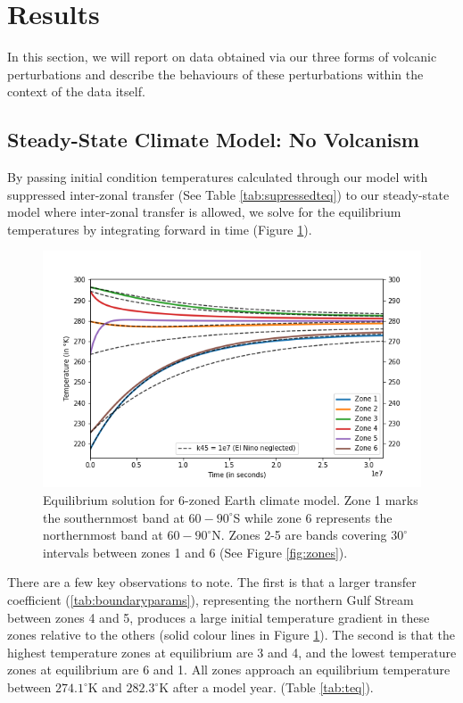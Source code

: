 \documentclass{article}
\begin{document}
\section{Results}
\label{section:results}
In this section, we will report on data obtained via our three forms of volcanic perturbations and describe the behaviours of these perturbations within the context of the data itself.

\subsection{Steady-State Climate Model: No Volcanism}
By passing initial condition temperatures calculated through our model with suppressed inter-zonal transfer (See Table \ref{tab:supressedteq}) to our steady-state model where inter-zonal transfer is allowed, we solve for the equilibrium temperatures by integrating forward in time (Figure \ref{fig:steadystate}). 

\begin{figure}[h]
    \centering
    \includegraphics[scale=0.5]{Question2.png}
    \caption{Equilibrium solution for 6-zoned Earth climate model. Zone 1 marks the southernmost band at $60-90^{\circ}$S while zone 6 represents the northernmost band at $60-90^{\circ}$N.
    Zones 2-5 are bands covering $30^{\circ}$ intervals between zones 1 and 6 (See Figure \ref{fig:zones}).}
    \label{fig:steadystate}
\end{figure}
\FloatBarrier

There are a few key observations to note. The first is that a larger transfer coefficient (\ref{tab:boundaryparams}), representing the northern Gulf Stream between zones 4 and 5, produces a large initial temperature gradient in these zones relative to the others (solid colour lines in Figure \ref{fig:steadystate}). The second is that the highest temperature zones at equilibrium are 3 and 4, and the lowest temperature zones at equilibrium are 6 and 1. All zones approach an equilibrium temperature between $274.1^{\circ}$K and $282.3^{\circ}$K after a model year. (Table \ref{tab:teq}).
\end{document}
